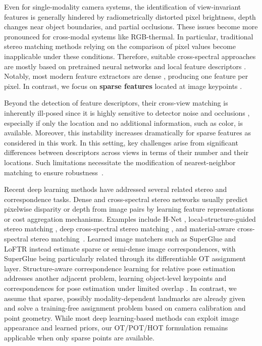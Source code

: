 \documentclass[10pt, twocolumn]{article}
\theoremstyle{definition}
\begin{document}
Even for single-modality camera systems, the identification of view-invariant features is generally hindered by radiometrically distorted pixel brightness, 
depth changes near object boundaries, and partial occlusions. 
These issues become more pronounced for cross-modal systems like RGB-thermal.
In particular, traditional stereo matching methods relying on the comparison of pixel values
\cite{CFNSS2015, dalal2005histograms,fsian2022comparisonstereomatchingalgorithms} become inapplicable under these conditions. Therefore, suitable cross-spectral approaches are mostly based on pretrained neural networks \cite{liu2022multi_cross_descr, kim2016dasc_cross_descr, pingera2012CSstereo_cross_desc,NNstereo2025} and local feature descriptors  \cite{liang2022deep_cross_learn,zhi2018deep_cross_learn}. 
Notably, most modern feature extractors are {dense}  \cite{guo2023unsupervised,li2024local}, producing one feature per pixel. In contrast, we focus on \textbf{sparse features} located at image keypoints \cite{schauwecker2012new}.

Beyond the detection of feature descriptors, their cross-view matching is inherently ill-posed since it is highly sensitive to detector noise and occlusions \cite{mikolajczyk2005performance,pingera2012CSstereo_cross_desc}, especially if only the location and no additional information, such as color, is available.
Moreover, this instability increases dramatically for {sparse features} as considered in this work.
In this setting, key challenges arise from significant differences between descriptors across views in terms of their number and their locations.
Such limitations necessitate the modification of nearest-neighbor matching to ensure robustness~\cite{schauwecker2012new}.

{\color{black}
Recent deep learning methods have addressed several related stereo and correspondence tasks. Dense and cross-spectral stereo networks usually predict pixelwise disparity or depth from image pairs by learning feature representations or cost aggregation mechanisms. Examples include H-Net \cite{huang2022h}, local-structure-guided stereo matching \cite{li2024local}, deep cross-spectral stereo matching \cite{liang2022deep_cross_learn}, and material-aware cross-spectral stereo matching~\cite{zhi2018deep_cross_learn}. Learned image matchers such as SuperGlue \cite{sarlin2020superglue} and LoFTR \cite{sun2021loftr} instead estimate sparse or semi-dense image correspondences, with SuperGlue being particularly related through its differentiable OT assignment layer. Structure-aware correspondence learning for relative pose estimation addresses another adjacent problem, learning object-level keypoints and correspondences for pose estimation under limited overlap \cite{chen2025structure}. In contrast, we assume that sparse, possibly modality-dependent landmarks are already given and solve a training-free assignment problem based on camera calibration and point geometry. While most deep learning-based methods can exploit image appearance and learned priors, our OT/POT/HOT formulation remains applicable when only sparse points are available.
}
\end{document}
